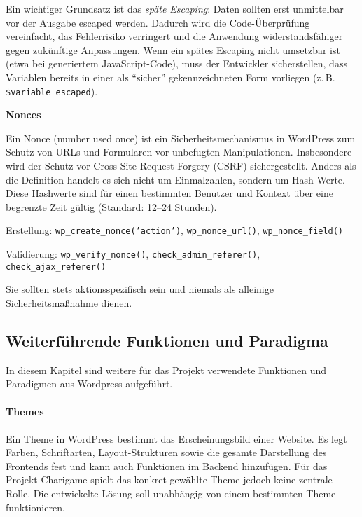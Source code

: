 Ein wichtiger Grundsatz ist das \emph{späte Escaping}: Daten sollten erst unmittelbar vor der Ausgabe escaped werden.
Dadurch wird die Code-Überprüfung vereinfacht, das Fehlerrisiko verringert und die Anwendung widerstandsfähiger gegen zukünftige Anpassungen.
Wenn ein spätes Escaping nicht umsetzbar ist (etwa bei generiertem JavaScript-Code), muss der Entwickler sicherstellen, dass Variablen bereits in einer als \enquote{sicher} gekennzeichneten Form vorliegen (z.\,B. \texttt{\$variable\_escaped}).

\textbf{Nonces}

Ein Nonce (number used once) ist ein Sicherheitsmechanismus in WordPress zum Schutz von URLs und Formularen vor unbefugten Manipulationen.
Insbesondere wird der Schutz vor Cross-Site Request Forgery (CSRF) sichergestellt.
Anders als die Definition handelt es sich nicht um Einmalzahlen, sondern um Hash-Werte.
Diese Hashwerte sind für einen bestimmten Benutzer und Kontext über eine begrenzte Zeit gültig (Standard: 12–24 Stunden).

Erstellung: \texttt{wp\_create\_nonce('action')}, \texttt{wp\_nonce\_url()}, \texttt{wp\_nonce\_field()}

Validierung: \texttt{wp\_verify\_nonce()}, \texttt{check\_admin\_referer()}, \texttt{check\_ajax\_referer()}

Sie sollten stets aktionsspezifisch sein und niemals als alleinige Sicherheitsmaßnahme dienen.




\subsection{Weiterführende Funktionen und Paradigma}
In diesem Kapitel sind weitere für das Projekt verwendete Funktionen und Paradigmen aus Wordpress aufgeführt.
\\
\\
\textbf{Themes}\\\\
Ein Theme in WordPress bestimmt das Erscheinungsbild einer Website.
Es legt Farben, Schriftarten, Layout-Strukturen sowie die gesamte Darstellung des Frontends fest und kann auch Funktionen im Backend hinzufügen.
Für das Projekt Charigame spielt das konkret gewählte Theme jedoch keine zentrale Rolle.
Die entwickelte Lösung soll unabhängig von einem bestimmten Theme funktionieren.




